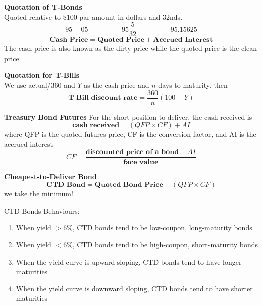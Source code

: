 \documentclass[11pt,fleqn]{report} %
\numberwithin{equation}{section} %
\numberwithin{figure}{section} %
\numberwithin{table}{section} %
\begin{document}
\begin{definition}\textbf{Quotation of T-Bonds}\\
Quoted relative to \$100 par amount in dollars and 32nds. 
$$
95-05\hspace{2cm}95\frac{5}{32}\hspace{2cm}95.15625
$$
$$
\textbf{Cash Price}=\textbf{Quoted Price}+\textbf{Accrued Interest}
$$
The cash price is also known as the dirty price while the quoted price is the clean price.
\end{definition} 
 
 \begin{definition}\textbf{Quotation for T-Bills}\\
 We use actual/360 and $Y$ as the cash price and $n$ days to maturity, then
 $$
 \textbf{T-Bill discount rate}=\frac{360}{n}(100-Y)
 $$
 \end{definition}
\begin{definition}\textbf{Treasury Bond Futures}
For the short position to deliver, the cash received is
$$
\textbf{cash received}=(QFP\times CF)+AI
$$
where QFP is the quoted futures price, CF is the conversion factor, and AI is the accrued interest
$$
CF=\frac{\textbf{discounted price of a bond}-AI}{\textbf{face value}}
$$
\end{definition}
 \begin{theorem}\textbf{Cheapest-to-Deliver Bond}\\
 $$
 \textbf{CTD Bond}=\textbf{Quoted Bond Price}-(QFP\times CF)
 $$
 we take the minimum!
 \end{theorem}
 \begin{remark}CTD Bonds Behaviours:
 \begin{enumerate}
     \item When yield $>6\%$, CTD bonds tend to be low-coupon, long-maturity bonds
     \item When yield $<6\%$, CTD bonds tend to be high-coupon, short-maturity bonds
     \item When the yield curve is upward sloping, CTD bonds tend to have longer maturities
     \item When the yield curve is downward sloping, CTD bonds tend to have shorter maturities
 \end{enumerate}
 \end{remark}
\end{document}
